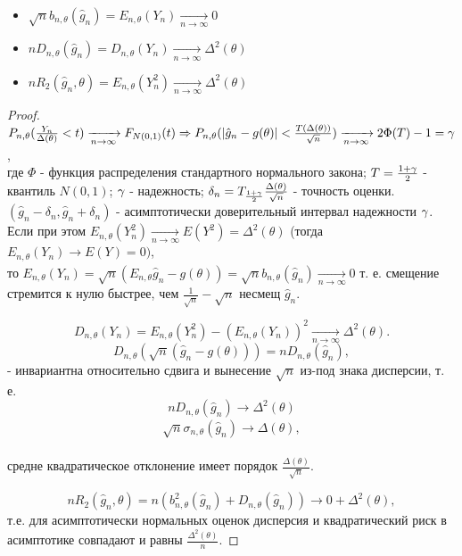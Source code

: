 \begin{proposition}
  \enewline
  \begin{itemize}
      \item $\sqrt{n}b_{n, \theta}(\hat{g}_n) = E_{n, \theta}(Y_n) \xrightarrow[n \to \infty]{} 0$
      \item $nD_{n, \theta}(\hat{g}_n) = D_{n, \theta}(Y_n) \xrightarrow[n \to \infty]{} \Delta^2(\theta)$
      \item $nR_2(\hat{g}_n, \theta) = E_{n, \theta}(Y^2_n) \xrightarrow[n \to \infty]{} \Delta^2(\theta)$
  \end{itemize}
\end{proposition}
\begin{proof}
  $P_{n, \theta}(\frac{Y_n}{\Delta(\theta)} < t) \xrightarrow[n \to \infty]{} F_{N(0, 1)}(t) \Rightarrow{} P_{n, \theta}(|\hat{g}_n - g(\theta)| < \frac{T(\Delta(\theta))} {\sqrt{n}}) \xrightarrow[n \to \infty]{} 2\Phi(T) - 1 = \gamma$, \\
  где $\Phi$ - функция распределения стандартного нормального закона; $T = \frac{1 + \gamma}{2}$ - квантиль $N(0, 1)$;
  $\gamma$ - надежность; $\delta_n = T_{\frac{1 + \gamma}{2}}\frac{\Delta(\theta)}{\sqrt{n}}$ - точность оценки. \\
  $(\hat{g}_n - \delta_n, \hat{g}_n + \delta_n)$ - асимптотически доверительный интервал надежности $\gamma$. \\
  Если при этом $E_{n, \theta}(Y_n^2) \xrightarrow[n \to \infty]{} E(Y^2) = \Delta^2(\theta)$ (тогда $E_{n, \theta}(Y_n) \xrightarrow[]{} E(Y) = 0)$, \\
  то $E_{n, \theta}(Y_n) = \sqrt{n}(E_{n, \theta}\hat{g}_n - g(\theta)) = \sqrt{n}b_{n, \theta}(\hat{g}_n) \xrightarrow[n \to \infty]{} 0$
  т. е. смещение стремится к нулю быстрее, чем $\frac{1}{\sqrt{n}} - \sqrt{n}$ несмещ $\hat{g}_n$.

  \[
    D_{n, \theta}(Y_n) = E_{n, \theta}(Y_n^2) - (E_{n, \theta}(Y_n))^2 \xrightarrow[n \to \infty]{} \Delta^2(\theta)
  .\]
  \[
    D_{n, \theta}(\sqrt{n}(\hat{g}_n - g(\theta))) = nD_{n, \theta}(\hat{g}_n)
  ,\] - инвариантна относительно сдвига и вынесение $\sqrt{n}$ из-под знака дисперсии, т. е.
  \[
    nD_{n, \theta}(\hat{g}_n) \xrightarrow[]{} \Delta^2(\theta)
  \]
  \[
    \sqrt{n}\sigma_{n, \theta}(\hat{g}_n) \xrightarrow[]{} \Delta(\theta)
  ,\] \\
средне квадратическое отклонение имеет порядок $\frac{\Delta(\theta)}{\sqrt{n}}$.

  \[
    nR_2(\hat{g}_n, \theta) = n(b_{n, \theta}^2(\hat{g}_n) + D_{n, \theta}(\hat{g}_n)) \xrightarrow[]{} 0 + \Delta^2(\theta)
  ,\]
  т.е. для асимптотически нормальных оценок дисперсия и квадратический риск в асимптотике совпадают и равны $\frac{\Delta^2(\theta)}{n}$.
\end{proof}

